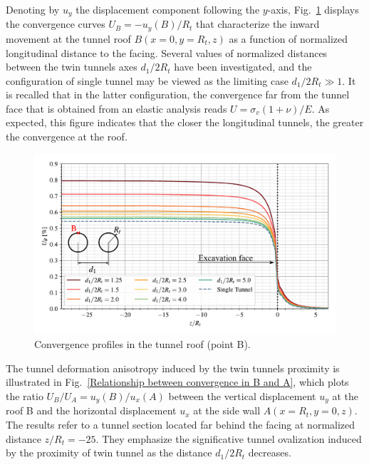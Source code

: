 \documentclass[a4paper,fleqn]{cas-sc}
\begin{document}
Denoting by $u_y$ the displacement component following the  $y$-axis, Fig.~\ref{Convergence Profiles in B} displays the convergence curves $U_B = -u_y(B)/R_t$ that characterize the inward movement at the tunnel roof $B(x=0,y=R_t,z)$ as a function of normalized longitudinal distance to the facing. Several values of normalized distances between the twin tunnels axes $d_1/2R_t$ have been investigated, and the configuration of single tunnel may be viewed as the limiting case $d_1/2R_t \gg 1$. It is recalled that in the latter configuration, the convergence far from the tunnel face that is obtained from an elastic analysis reads $U = \sigma_v(1+\nu)/E$. As expected, this figure indicates that the closer the longitudinal tunnels, the greater the convergence at the roof.
\begin{figure}[h!]
	\centering
	\includegraphics[scale=0.65]{Convergence Profiles in B.pdf}
	\caption{Convergence profiles in the tunnel roof (point B).}
	\label{Convergence Profiles in B}
\end{figure}
\FloatBarrier

The tunnel deformation anisotropy induced by the twin tunnels proximity is illustrated in Fig.~\ref{Relationship between convergence in B and A}, which plots the ratio $U_B/U_A = u_y(B)/u_x(A)$ between the vertical displacement $u_y$ at the roof B and the horizontal displacement $u_x$ at the side wall  $A(x=R_t, y = 0, z)$. The results refer to a tunnel section located far behind the facing at normalized distance $z/R_t = -25$. They emphasize the significative tunnel ovalization induced by the proximity of twin tunnel as the distance $d_1/2R_t$ decreases. 
\end{document}
